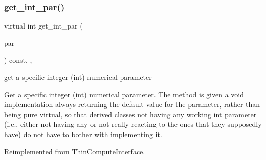 \mbox{\label{class_s_m_spp__di__unipi__it_1_1_f_row_constraint_aaaa5e72533153b149c26c1cc7ab1fe70}} 
\subsubsection{\texorpdfstring{get\+\_\+int\+\_\+par()}{get\_int\_par()}}
{\footnotesize\ttfamily virtual int get\+\_\+int\+\_\+par (\begin{DoxyParamCaption}\item[{const \mbox{\hyperlink{class_s_m_spp__di__unipi__it_1_1_thin_compute_interface_aa3d710629ad8c434286726ad810c3b47}{idx\+\_\+type}}}]{par }\end{DoxyParamCaption}) const\hspace{0.3cm}{\ttfamily [inline]}, {\ttfamily [override]}, {\ttfamily [virtual]}}



get a specific integer (int) numerical parameter 

Get a specific integer (int) numerical parameter. The method is given a void implementation always returning the default value for the parameter, rather than being pure virtual, so that derived classes not having any working int parameter (i.\+e., either not having any or not really reacting to the ones that they supposedly have) do not have to bother with implementing it. 

Reimplemented from \mbox{\hyperlink{class_s_m_spp__di__unipi__it_1_1_thin_compute_interface_a9403da6fd83a275dfdf21ec4db71c744}{Thin\+Compute\+Interface}}.

\mbox{\label{class_s_m_spp__di__unipi__it_1_1_f_row_constraint_acc8ac3c57cc2c71ac3fe6c409fe53074}} 
